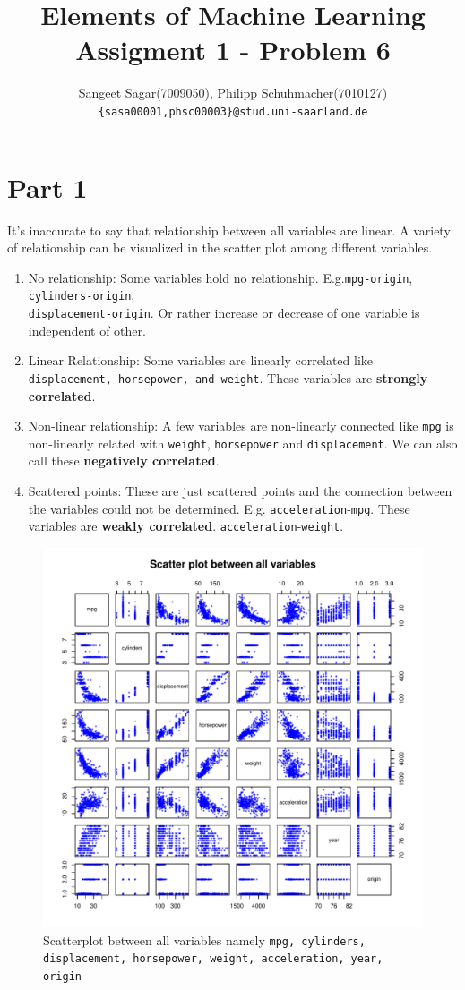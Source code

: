 \documentclass{article}[a4paper]
\title{\textbf{Elements of Machine Learning}\\
Assigment 1 - Problem 6
}
\author{ Sangeet Sagar(7009050), Philipp Schuhmacher(7010127)\\
        \texttt{\{sasa00001,phsc00003\}@stud.uni-saarland.de}
}
\begin{document}
\maketitle
\section*{Part 1}
It's inaccurate to say that relationship between all variables are linear. A variety of relationship can be visualized in the scatter plot among different variables.
\begin{enumerate}
    \item No relationship: Some variables hold no relationship. E.g.\texttt{mpg-origin}, \texttt{cylinders-origin},\\ \texttt{displacement-origin}. Or rather increase or decrease of one variable is independent of other.
    \item Linear Relationship: Some variables are linearly correlated like \texttt{displacement, horsepower, and weight}. These variables are \textbf{strongly correlated}.
    \item Non-linear relationship: A few variables are non-linearly connected like \texttt{mpg} is non-linearly related with \texttt{weight}, \texttt{horsepower} and \texttt{displacement}. We can also call these \textbf{negatively correlated}.
    \item Scattered points: These are just scattered points and the connection between the variables could not be determined. E.g. \texttt{acceleration}-\texttt{mpg}. These variables are \textbf{weakly correlated}. \texttt{acceleration}-\texttt{weight}.
\end{enumerate}

\begin{figure}[H]
    \centering
    \includegraphics[width=6in]{HW1/rplot.pdf}
    \caption{Scatterplot between all variables namely \texttt{mpg, cylinders, displacement, horsepower, weight, acceleration, year, origin}}
\end{figure}
\end{document}
